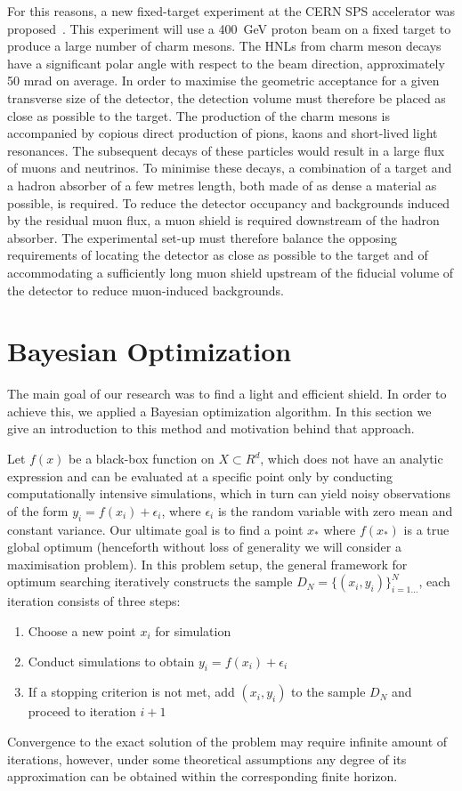 \documentclass[a4paper]{jpconf}
\theoremstyle{my_theorem_style}
\numberwithin{equation}{section}
\begin{document}
For this reasons, a new fixed-target experiment at the CERN SPS accelerator was proposed~\cite{Bonivento:2013jag}. This experiment will use a 400~GeV proton beam on a fixed target to produce a large number of charm mesons. The HNLs from charm meson decays have a significant polar angle with respect to the beam direction, approximately 50 mrad on average. In order to maximise the geometric
acceptance for a given transverse size of the detector, the detection volume must therefore be placed
as close as possible to the target. The production of the charm mesons is accompanied by copious direct production of pions, kaons and short-lived light resonances. The subsequent decays of these particles would result in a large flux of muons and neutrinos. To minimise these decays, a combination of a target and a hadron absorber of a few metres length, both made of as dense a material as possible, is required. To reduce the detector occupancy and backgrounds induced by the residual muon flux, a muon shield is required downstream of the hadron absorber. The experimental set-up must therefore balance the opposing requirements of locating the detector as close as possible to the target and of accommodating a sufficiently long muon shield upstream of the fiducial volume of the detector to reduce muon-induced backgrounds.

\section{Bayesian Optimization}
The main goal of our research was to find a light and efficient shield. In order to achieve this, we applied a Bayesian optimization algorithm. In this section we give an introduction to this method and motivation behind that approach.

Let $f(x)$ be a black-box function on $X \subset R^d$, which does not have an analytic expression and can be evaluated at a specific point only by conducting computationally intensive simulations, which in turn can yield noisy observations of the form $y_i = f(x_i) + \epsilon_i$, where $\epsilon_i$ is the random variable with zero mean and constant variance. Our ultimate goal is to find a point $x_*$ where $f(x_*)$ is a true global optimum (henceforth without loss of generality we will consider a maximisation problem). In this problem setup, the general framework for optimum searching iteratively constructs the sample $D_N = \{(x_i, y_i)\}_{i=1…}^N$, each iteration consists of three steps:
\begin{enumerate}
\item \label{point_choosing} Choose a new point $x_{i}$ for simulation 
\item Conduct simulations to obtain $y_{i} = f(x_{i}) + \epsilon_i$
\item If a stopping criterion is not met, add $(x_{i}, y_{i})$ to the sample $D_N$ and proceed to iteration $i+1$
\end{enumerate}
Convergence to the exact solution of the problem may require infinite amount of iterations, however, under some theoretical assumptions any degree of its approximation can be obtained within the corresponding finite horizon.
\end{document}
